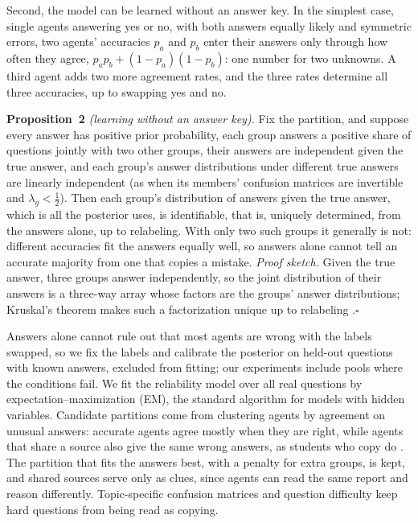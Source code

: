 \documentclass[12pt,letterpaper]{article}
\begin{document}
Second, the model can be learned without an answer key. In the simplest case, single agents answering yes or no, with both answers equally likely and symmetric errors, two agents' accuracies $p_a$ and $p_b$ enter their answers only through how often they agree, $p_ap_b+(1-p_a)(1-p_b)$: one number for two unknowns. A third agent adds two more agreement rates, and the three rates determine all three accuracies, up to swapping yes and no.

\textbf{Proposition~2} \textit{(learning without an answer key).} Fix the partition, and suppose every answer has positive prior probability, each group answers a positive share of questions jointly with two other groups, their answers are independent given the true answer, and each group's answer distributions under different true answers are linearly independent (as when its members' confusion matrices are invertible and $\lambda_g<\frac12$). Then each group's distribution of answers given the true answer, which is all the posterior uses, is identifiable, that is, uniquely determined, from the answers alone, up to relabeling. With only two such groups it generally is not: different accuracies fit the answers equally well, so answers alone cannot tell an accurate majority from one that copies a mistake. \textit{Proof sketch.} Given the true answer, three groups answer independently, so the joint distribution of their answers is a three-way array whose factors are the groups' answer distributions; Kruskal's theorem makes such a factorization unique up to relabeling \citep{kruskal1977three,allman2009identifiability}.\hfill$\square$

Answers alone cannot rule out that most agents are wrong with the labels swapped, so we fix the labels and calibrate the posterior on held-out questions with known answers, excluded from fitting; our experiments include pools where the conditions fail. We fit the reliability model over all real questions by expectation--maximization (EM), the standard algorithm for models with hidden variables. Candidate partitions come from clustering agents by agreement on unusual answers: accurate agents agree mostly when they are right, while agents that share a source also give the same wrong answers, as students who copy do \citep{dong2009dependence}. The partition that fits the answers best, with a penalty for extra groups, is kept, and shared sources serve only as clues, since agents can read the same report and reason differently. Topic-specific confusion matrices and question difficulty \citep{whitehill2009whose} keep hard questions from being read as copying. 
\end{document}

